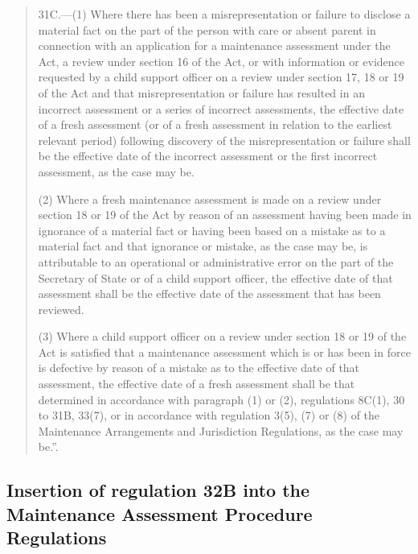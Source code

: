 \documentclass[12pt,a4paper]{article}
\begin{document}
\begin{quotation}
31C.—(1) Where there has been a misrepresentation or failure to disclose a material fact on the part of the person with care or absent parent in connection with an application for a maintenance assessment under the Act, a review under section 16 of the Act, or with information or evidence requested by a child support officer on a review under section 17, 18 or 19 of the Act and that misrepresentation or failure has resulted in an incorrect assessment or a series of incorrect assessments, the effective date of a fresh assessment (or of a fresh assessment in relation to the earliest relevant period) following discovery of the misrepresentation or failure shall be the effective date of the incorrect assessment or the first incorrect assessment, as the case may be.

(2) Where a fresh maintenance assessment is made on a review under section 18 or 19 of the Act by reason of an assessment having been made in ignorance of a material fact or having been based on a mistake as to a material fact and that ignorance or mistake, as the case may be, is attributable to an operational or administrative error on the part of the Secretary of State or of a child support officer, the effective date of that assessment shall be the effective date of the assessment that has been reviewed.

(3) Where a child support officer on a review under section 18 or 19 of the Act is satisfied that a maintenance assessment which is or has been in force is defective by reason of a mistake as to the effective date of that assessment, the effective date of a fresh assessment shall be that determined in accordance with paragraph (1) or (2), regulations 8C(1), 30 to 31B, 33(7), or in accordance with regulation 3(5), (7) or (8) of the Maintenance Arrangements and Jurisdiction Regulations, as the case may be.”.
\end{quotation}

\subsection[35. Insertion of regulation 32B into the Maintenance Assessment Procedure Regulations]{Insertion of regulation 32B into the Maintenance Assessment Procedure Regulations}
\end{document}
